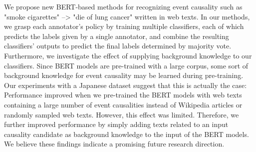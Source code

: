 We propose new BERT-based methods for recognizing event causality such as "smoke cigarettes" --> "die of lung cancer" written in web texts. In our methods, we grasp each annotator's policy by training multiple classifiers, each of which predicts the labels given by a single annotator, and combine the resulting classifiers' outputs to predict the final labels determined by majority vote. Furthermore, we investigate the effect of supplying background knowledge to our classifiers. Since BERT models are pre-trained with a large corpus, some sort of background knowledge for event causality may be learned during pre-training. Our experiments with a Japanese dataset suggest that this is actually the case: Performance improved when we pre-trained the BERT models with web texts containing a large number of event causalities instead of Wikipedia articles or randomly sampled web texts. However, this effect was limited. Therefore, we further improved performance by simply adding texts related to an input causality candidate as background knowledge to the input of the BERT models.  We believe these findings indicate a promising future research direction.